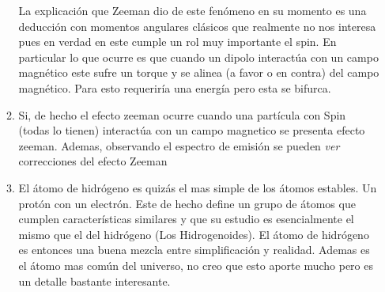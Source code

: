 \documentclass[12pt]{exam}
\begin{document}
\begin{enumerate}
\begin{enumerate}
	La explicación que Zeeman dio de este fenómeno en su momento es una deducción con momentos angulares clásicos que realmente no nos interesa pues en verdad en este cumple un rol muy importante el spin. En particular lo que ocurre es que cuando un dipolo interactúa con un campo magnético este sufre un torque y se alinea (a favor o en contra) del campo magnético. Para esto requeriría una energía pero esta se bifurca.
      \item Si, de hecho el efecto zeeman ocurre cuando una partícula con Spin (todas lo tienen) interactúa con un campo magnetico se presenta efecto zeeman. Ademas, observando el espectro de emisión se pueden \textit{ver} correcciones del efecto Zeeman
      \item El átomo de hidrógeno es quizás el mas simple de los átomos estables. Un protón con un electrón. Este de hecho define un grupo de átomos que cumplen características similares y que su estudio es esencialmente el mismo que el del hidrógeno (Los Hidrogenoides). El átomo de hidrógeno es entonces una buena mezcla entre simplificación y realidad. Ademas es el átomo mas común del universo, no creo que esto aporte mucho pero es un detalle bastante interesante. 
    \end{enumerate}
\end{enumerate}
\end{document}

